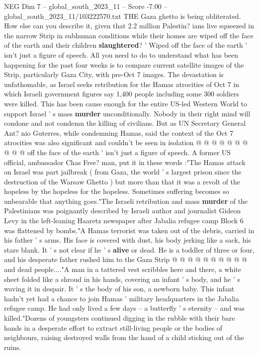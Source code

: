 \begin{textsample}{NEG Dim 7 – global\_south\_2023\_11 – Score -7.00 – global\_south\_2023\_11/103222570.txt}  \label{ex:f7_neg_323}
THE Gaza ghetto is being obliterated.
How else can you describe it, given that 2.2 million Palestin? ians live squeezed in the narrow Strip in subhuman conditions while their homes are wiped off the face of the earth and their children \textbf{slaughtered}? ' Wiped off the face of the earth ' isn't just a figure of speech.
All you need to do to understand what has been happening for the past four weeks is to compare current satellite images of the Strip, particularly Gaza City, with pre-Oct 7 images.
The devastation is unfathomable, as Israel seeks retribution for the Hamas atrocities of Oct 7 in which Israeli government figures say 1,400 people including some 300 soldiers were killed.
This has been cause enough for the entire US-led Western World to support Israel ' s mass \textbf{murder} unconditionally.
Nobody in their right mind will condone and not condemn the killing of civilians.
But as UN Secretary General Ant? nio Guterres, while condemning Hamas, said the context of the Oct 7 atrocities was also significant and couldn't be seen in isolation @ @ @ @ @ @ @ @ @ @ off the face of the earth ' isn't just a figure of speech.
A former US official, ambassador Chas Free? man, put it in these words :"The Hamas attack on Israel was part jailbreak ( from Gaza, the world ' s largest prison since the destruction of the Warsaw Ghetto ) but more than that it was a revolt of the hopeless by the hopeless for the hopeless.
Sometimes suffering becomes so unbearable that anything goes."The Israeli retribution and mass \textbf{murder} of the Palestinians was poignantly described by Israeli author and journalist Gideon Levy in the left-leaning Haaretz newspaper after Jabalia refugee camp Block 6 was flattened by bombs."A Hamas terrorist was taken out of the debris, carried in his father ' s arms.
His face is covered with dust, his body jerking like a sack, his stare blank.
It ' s not clear if he ' s \textbf{alive} or dead.
He is a toddler of three or four, and his desperate father rushed him to the Gaza Strip @ @ @ @ @ @ @ @ @ @ and dead people...."A man in a tattered vest scribbles here and there, a white sheet folded like a shroud in his hands, covering an infant ' s body, and he ' s waving it in despair.
It ' s the body of his son, a newborn baby.
This infant hadn't yet had a chance to join Hamas ' military headquarters in the Jabalia refugee camp.
He had only lived a few days -- a butterfly ' s eternity -- and was killed."Dozens of youngsters continued digging in the rubble with their bare hands in a desperate effort to extract still-living people or the bodies of neighbours, raising destroyed walls from the hand of a child sticking out of the ruins.

\end{textsample}
